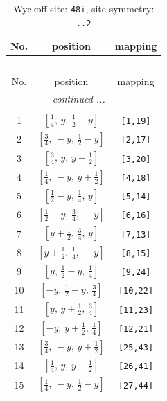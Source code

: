 \documentclass[fleqn,8pt]{jsarticle}
\begin{document}
\begin{longtable}{ccc}
\caption{Wyckoff site: {\tt 48i}, site symmetry: {\tt ..2}}
 \\
 \hline \hline
No. & position & mapping \\ \hline \endfirsthead

\multicolumn{2}{l}{\tablename\ \thetable{}} \\
 \hline \hline
No. & position & mapping \\ \hline \endhead

 \hline \hline
\multicolumn{2}{r}{\footnotesize\it continued ...} \\ \endfoot

 \hline \hline
\multicolumn{2}{r}{} \\ \endlastfoot

1 & $\left[ \frac{1}{4},\, y,\, \frac{1}{2} - y \right]$ & {\tt [1,19]} \\ \hline
2 & $\left[ \frac{3}{4},\, - y,\, \frac{1}{2} - y \right]$ & {\tt [2,17]} \\ \hline
3 & $\left[ \frac{3}{4},\, y,\, y + \frac{1}{2} \right]$ & {\tt [3,20]} \\ \hline
4 & $\left[ \frac{1}{4},\, - y,\, y + \frac{1}{2} \right]$ & {\tt [4,18]} \\ \hline
5 & $\left[ \frac{1}{2} - y,\, \frac{1}{4},\, y \right]$ & {\tt [5,14]} \\ \hline
6 & $\left[ \frac{1}{2} - y,\, \frac{3}{4},\, - y \right]$ & {\tt [6,16]} \\ \hline
7 & $\left[ y + \frac{1}{2},\, \frac{3}{4},\, y \right]$ & {\tt [7,13]} \\ \hline
8 & $\left[ y + \frac{1}{2},\, \frac{1}{4},\, - y \right]$ & {\tt [8,15]} \\ \hline
9 & $\left[ y,\, \frac{1}{2} - y,\, \frac{1}{4} \right]$ & {\tt [9,24]} \\ \hline
10 & $\left[ - y,\, \frac{1}{2} - y,\, \frac{3}{4} \right]$ & {\tt [10,22]} \\ \hline
11 & $\left[ y,\, y + \frac{1}{2},\, \frac{3}{4} \right]$ & {\tt [11,23]} \\ \hline
12 & $\left[ - y,\, y + \frac{1}{2},\, \frac{1}{4} \right]$ & {\tt [12,21]} \\ \hline
13 & $\left[ \frac{3}{4},\, - y,\, y + \frac{1}{2} \right]$ & {\tt [25,43]} \\ \hline
14 & $\left[ \frac{1}{4},\, y,\, y + \frac{1}{2} \right]$ & {\tt [26,41]} \\ \hline
15 & $\left[ \frac{1}{4},\, - y,\, \frac{1}{2} - y \right]$ & {\tt [27,44]} \\ \hline

\end{longtable}
\end{document}
